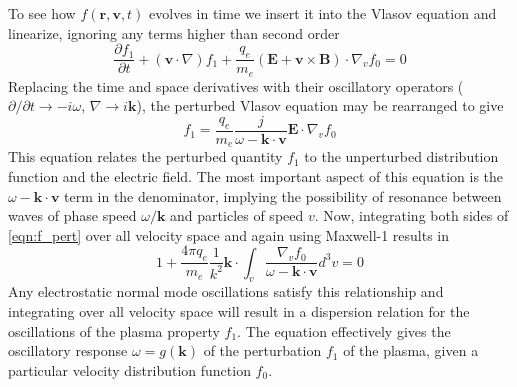 To see how $f(\mathbf{r}, \mathbf{v}, t)$ evolves in time we insert it into the Vlasov equation and linearize, ignoring any terms higher than second order
\begin{equation}
\frac{\partial f_1}{\partial t} + (\mathbf{v}\cdot \nabla)f_1 +\frac{q_e}{m_e}(\mathbf{E} + \mathbf{v}\times \mathbf{B})\cdot\nabla_vf_0=0
\end{equation}
Replacing the time and space derivatives with their oscillatory operators ($\partial/\partial t \rightarrow -i\omega$, $\nabla \rightarrow i\mathbf{k}$), the perturbed Vlasov equation may be rearranged to give
\begin{equation}
f_1=\frac{q_e}{m_e}\frac{j}{\omega-\mathbf{k\cdot v}}\mathbf{E}\cdot\nabla_vf_0
\label{eqn:f_pert}
\end{equation}
This equation relates the perturbed quantity $f_1$ to the unperturbed distribution function and the electric field. The most important aspect of this equation is the $\omega-\mathbf{k\cdot v}$ term in the denominator, implying the possibility of resonance between waves of phase speed $\omega/\mathbf{k}$ and particles of speed $v$. Now, integrating both sides of \ref{eqn:f_pert} over all velocity space and again using Maxwell-1 results in
\begin{equation}
1+\frac{4\pi q_e}{m_e}\frac{1}{k^2}\mathbf{k}\cdot\int_v\frac{\nabla_v f_0}{\omega-\mathbf{k\cdot v}}d^3v=0
\label{eqn:dispersion}
\end{equation}
Any electrostatic normal mode oscillations satisfy this relationship and integrating over all velocity space will result in a dispersion relation for the oscillations of the plasma property $f_1$. The equation effectively gives the oscillatory response $\omega = g(\mathbf{k})$ of the perturbation $f_1$ of the plasma, given a particular velocity distribution function $f_0$. 


